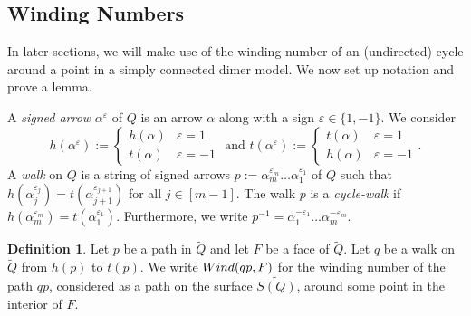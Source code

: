 \documentclass{article}
\theoremstyle{definition}
\newtheorem{defn}[thm]{Definition}
\newcommand{\wind}{\textup{Wind}}
\begin{document}
    


\subsection{Winding Numbers}\label{ssec:wnt}

In later sections, we will make use of the {winding number} of an (undirected) cycle around a point in a simply connected dimer model. We now set up notation and prove a lemma.

A \textit{signed arrow} $\alpha^{\varepsilon}$ of $Q$ is an arrow $\alpha$ along with a sign $\varepsilon\in\{1,-1\}$. We consider 
\[h(\alpha^\varepsilon):=\begin{cases}
h(\alpha)&\varepsilon=1\\t(\alpha)&\varepsilon=-1\end{cases} \text{ and }
t(\alpha^\varepsilon):=\begin{cases}
t(\alpha)&\varepsilon=1\\h(\alpha)&\varepsilon=-1\end{cases}.\]
A \textit{walk} on $Q$ is a string of signed arrows $p:=\alpha_m^{\varepsilon_m}\dots\alpha_1^{\varepsilon_1}$ of $Q$ such that $h(\alpha_j^{\varepsilon_j})=t(\alpha_{j+1}^{\varepsilon_{j+1}})$ for all $j\in[m-1]$. The walk $p$ is a \textit{cycle-walk} if $h(\alpha_m^{\varepsilon_m})=t(\alpha_1^{\varepsilon_1})$.  Furthermore, we write $p^{-1}=\alpha_1^{-\varepsilon_1}\dots \alpha_m^{-\varepsilon_m}$.

\begin{defn}\label{defn:winding-number}
	Let $p$ be a path in $\widetilde Q$ and let $F$ be a face of $\widetilde Q$. Let $q$ be a walk on $\widetilde Q$ from $h(p)$ to $t(p)$. We write $\wind(qp,F)$ for the winding number of the path $qp$, considered as a path on the surface $\widetilde{S(Q)}$,  around some point in the interior of $F$.
\end{defn}
\end{document}
